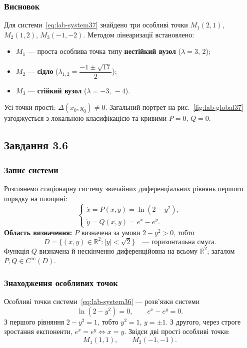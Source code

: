\subsubsection{Висновок}

Для системи~\eqref{eq:lab-system37} знайдено три особливі точки $M_1(2,1)$, $M_2(1,2)$, $M_3(-1,-2)$.
Методом лінеаризації встановлено:
\begin{itemize}
    \item $M_1$ --- проста особлива точка типу \textbf{нестійкий вузол} ($\lambda=3,\,2$);
    \item $M_2$ --- \textbf{сідло} ($\lambda_{1,2}=\dfrac{-1\pm\sqrt{17}}{2}$);
    \item $M_3$ --- \textbf{стійкий вузол} ($\lambda=-3,\,-4$).
\end{itemize}
Усі точки прості: $\Delta(x_0,y_0)\neq 0$.
Загальний портрет на рис.~\ref{fig:lab-global37} узгоджується з локальною класифікацією та кривими $P=0$, $Q=0$.

\newpage
\subsection{Завдання 3.6}

\subsubsection{Запис системи}

Розглянемо cтаціонарну систему звичайних диференціальних рівнянь першого порядку на площині:
\begin{equation}\label{eq:lab-system36}
\begin{cases}
\dot{x} = P(x,y) = \ln(2-y^2),\\
\dot{y} = Q(x,y) = e^{x} - e^{y}.
\end{cases}
\end{equation}
\textbf{Область визначення:} $P$ визначена за умови $2-y^2>0$, тобто
\begin{equation*}
D = \{(x,y)\in\mathbb{R}^2 : |y|<\sqrt{2}\} \quad\text{— горизонтальна смуга.}
\end{equation*}
Функція $Q$ визначена й нескінченно диференційовна на всьому $\mathbb{R}^2$; загалом $P,Q\in C^\infty(D)$.

\subsubsection{Знаходження особливих точок}

Особливі точки системи~\eqref{eq:lab-system36} --- розв'язки системи
\begin{equation*}
\ln(2-y^2)=0,\qquad e^{x}-e^{y}=0.
\end{equation*}
З першого рівняння $2-y^2=1$, тобто $y^2=1$, $y=\pm 1$.
З другого, через строге зростання експоненти, $e^x=e^y \Leftrightarrow x=y$.
Звідси дві прості особливі точки:
\begin{equation*}
M_1(1,1),\qquad M_2(-1,-1).
\end{equation*}

